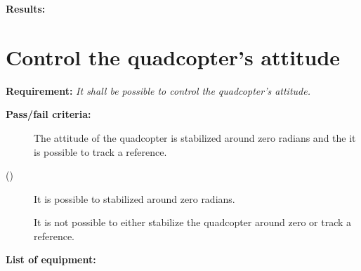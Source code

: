 \textbf{Results:}

\newpage

\section{Control the quadcopter's attitude}
\textbf{Requirement:}
\textit{It shall be possible to control the quadcopter's attitude.}

\textbf{Pass/fail criteria:}
	\begin{description}
	\item[] The attitude of the quadcopter is stabilized around zero radians and the it is possible to track a reference.
	\item[()] It is possible to stabilized around zero radians.
	\item[ \phantom{)}] It is not possible to either stabilize the quadcopter around zero or track a reference.
	\end{description}

\textbf{List of equipment:}	

